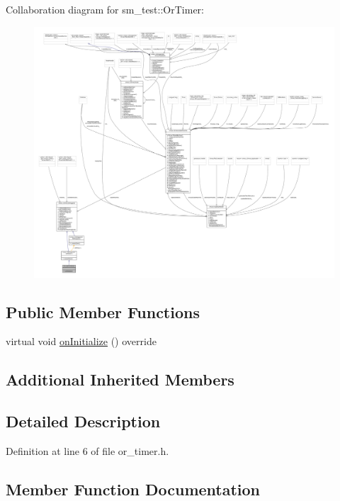 Collaboration diagram for sm\+\_\+test\+:\+:Or\+Timer\+:
\nopagebreak
\begin{figure}[H]
\begin{center}
\leavevmode
\includegraphics[width=350pt]{classsm__test_1_1OrTimer__coll__graph}
\end{center}
\end{figure}
\subsection*{Public Member Functions}
\begin{DoxyCompactItemize}
\item 
virtual void \hyperlink{classsm__test_1_1OrTimer_ae37eaf4bcf75d7108a69e4f4bf257f32}{on\+Initialize} () override
\end{DoxyCompactItemize}
\subsection*{Additional Inherited Members}


\subsection{Detailed Description}


Definition at line 6 of file or\+\_\+timer.\+h.



\subsection{Member Function Documentation}
